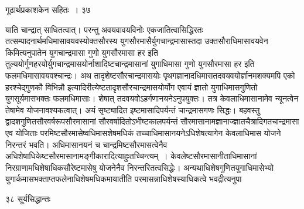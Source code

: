 \documentclass[11pt, openany]{book}
\begin{document}
\newpage

\hspace{3cm} गूढार्थप्रकाशकेन सहितः~। \hfill ३७
\vspace{1cm}

\begin{sloppypar}
\noindent याति चान्द्रात् साधितत्वात्। परन्तु अवयवावयविनोः एकजातित्वासिद्धिरतः तत्सम्पादनार्थमधिमासावयवस्योक्तसौरस्य युगसौरमासैर्युगचान्द्रमासास्तदा उक्तसौराधिमासावयवेन किमित्यनुपातेन युगचान्द्रमासा गुणो युगसौरमासा हर इति तुल्ययोर्गुणहरयोर्युगचान्द्रमासयोर्नाशादिष्टचान्द्रमासानां युगाधिमासा गुणो युगसौरमासा हर इति फलमधिमासावयवश्चान्द्रः। अथ तादृशेष्टसौरचान्द्रमासयोः पृथगज्ञानादधिमासतदवयवयोर्ज्ञानमशक्यमपि एको हरश्चेद्गुणकौ विभिन्नौ इत्यादिरीत्येष्टतादृशसौरचान्द्रमासयोर्योग एवायं ज्ञातो युगाधिमासगुणितो युगसूर्यमासभक्तः फलमधिमासाः। शेषात् तदवयवोऽहर्गणानयनेऽनुपयुक्तः। तत्र केवलाधिमासानामेव न्यूनत्वेन तेषामेव योजनावश्यकत्वात्। अयं सृष्ट्यादित इष्टमासादिपर्यन्तं चान्द्रमासगणः सिद्धः। बहवस्तु द्वादशगुणितसौरवर्षरूपसौरमासानां सौरवर्षादितोऽभीष्टकालपर्यन्तं सौरमासानामज्ञानाज्ज्ञातचैत्रादिगतचान्द्रमासा एव योजिताः परमिष्टसौरमासेष्वधिमासशेषमधिकं तच्चाधिमासानयनेऽधिशेषत्यागेन केवलाधिमास योजने निरन्तरं भवति। अधिमासानयनं च चान्द्रमिष्टसौरमासत्वेनैव अधिशेषाधिकेष्टसौरमासानामङ्गीकारादित्याहुः\textendash तच्चिन्त्यम्~। केवलेष्टसौरमासानीताधिमासानां निरग्राणामधिशेषाधिकसौरेष्टमासेषु योजनेनैव निरन्तरितत्वसिद्धेः। अन्यथाधिशेषगुणितयुगाधिमासेभ्यो युगार्कमासभक्ताप्तफलेनाधिशेषमधिकमायातीति परमासन्नाधिशेषस्याधिकत्वे भवद्रीत्यनुपा\textendash
\end{sloppypar}

\newpage

\noindent ३८ \hspace{4cm} सूर्यसिद्धान्तः 
\vspace{1cm}
\end{document}
